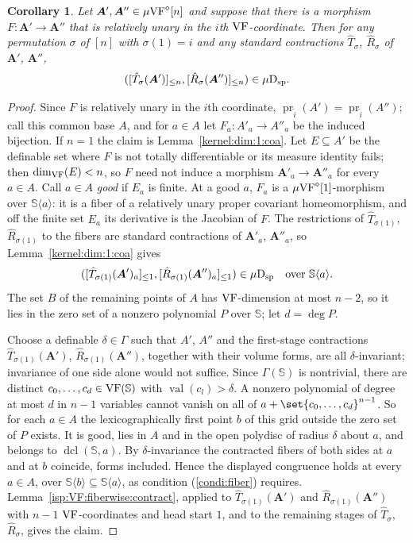 \documentclass[12pt]{amsart}
\newcommand{\memph}[1]{{\color{magenta}\emph{#1}}}
\theoremstyle{plain}
\newtheorem{cor}[thm]{Corollary}
\theoremstyle{definition}
\theoremstyle{remark}
\numberwithin{equation}{section}
\theoremstyle{plain}
\newcommand{\VF}{\textup{VF}}
\DeclareMathOperator{\dcl}{dcl}
\DeclareMathOperator{\pr}{pr}
\newcommand{\0}{\emptyset}
\newcommand{\fun}{\longrightarrow}
\newcommand{\sub}{\subseteq}
\newcommand{\la}{\langle}
\newcommand{\ra}{\rangle}
\newcommand{\mVF}{{\mu}{\VF}}
\newcommand{\dsp}{\textup{D}_{\textup{sp}}}
\newcommand{\mispdb}{\mu \dsp}
\DeclareMathOperator{\vv}{val}
\begin{document}
\begin{cor}\label{contraction:same:perm:isp}
Let $\bm A', \bm A'' \in \mVF^{\diamond}[n]$ and suppose that there is a morphism $F : \bm A' \fun \bm A''$ that is relatively unary in the $i$th $\VF$-coordinate. Then for any permutation $\sigma$ of $[n]$ with $\sigma(1) = i$ and any standard contractions $\hat T_{\sigma}$, $\hat R_{\sigma}$ of $\bm A'$, $\bm A''$,
\[
([\hat T_{\sigma}(\bm A')]_{\leq n}, [\hat R_{\sigma}(\bm A'')]_{\leq n}) \in \mispdb.
\]
\end{cor}
\begin{proof}
Since $F$ is relatively unary in the $i$th coordinate, $\pr_{\tilde i}(A') = \pr_{\tilde i}(A'')$; call this common base $A$, and for $a \in A$ let $F_a : A'_a \fun A''_a$ be the induced bijection. If $n = 1$ the claim is Lemma~\ref{kernel:dim:1:coa}. Let $E \sub A'$ be the definable set where $F$ is not totally differentiable or its measure identity fails; then $\dim_{\VF}(E) < n$, so $F$ need not induce a morphism $\bm A'_a \fun \bm A''_a$ for every $a \in A$. Call $a \in A$ \memph{good} if $E_a$ is finite. At a good $a$, $F_a$ is a $\mVF^\diamond[1]$-morphism over $\mathbb S \la a \ra$: it is a fiber of a relatively unary proper covariant homeomorphism, and off the finite set $E_a$ its derivative is the Jacobian of $F$. The restrictions of $\hat T_{\sigma(1)}$, $\hat R_{\sigma(1)}$ to the fibers are standard contractions of $\bm A'_a$, $\bm A''_a$, so Lemma~\ref{kernel:dim:1:coa} gives
\[
([\hat T_{\sigma(1)}(\bm A')_a]_{\leq 1}, [\hat R_{\sigma(1)}(\bm A'')_a]_{\leq 1}) \in \mispdb \quad \text{over } \mathbb S \la a \ra.
\]
The set $B$ of the remaining points of $A$ has $\VF$-dimension at most $n-2$, so it lies in the zero set of a nonzero polynomial $P$ over $\mathbb S$; let $d = \deg P$.

Choose a definable $\delta \in \Gamma$ such that $A'$, $A''$ and the first-stage contractions $\hat T_{\sigma(1)}(\bm A')$, $\hat R_{\sigma(1)}(\bm A'')$, together with their volume forms, are all $\delta$-invariant; invariance of one side alone would not suffice. Since $\Gamma(\mathbb S)$ is nontrivial, there are distinct $c_0, \ldots, c_d \in \VF(\mathbb S)$ with $\vv(c_l) > \delta$. A nonzero polynomial of degree at most $d$ in $n-1$ variables cannot vanish on all of $a + \set{c_0, \ldots, c_d}^{n-1}$. So for each $a \in A$ the lexicographically first point $b$ of this grid outside the zero set of $P$ exists. It is good, lies in $A$ and in the open polydisc of radius $\delta$ about $a$, and belongs to $\dcl(\mathbb S, a)$. By $\delta$-invariance the contracted fibers of both sides at $a$ and at $b$ coincide, forms included. Hence the displayed congruence holds at every $a \in A$, over $\mathbb S \la b \ra \sub \mathbb S \la a \ra$, as condition (\ref{condi:fiber}) requires. Lemma~\ref{isp:VF:fiberwise:contract}, applied to $\hat T_{\sigma(1)}(\bm A')$ and $\hat R_{\sigma(1)}(\bm A'')$ with $n-1$ $\VF$-coordinates and head start $1$, and to the remaining stages of $\hat T_\sigma$, $\hat R_\sigma$, gives the claim.
\end{proof}
\end{document}
